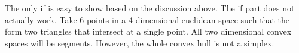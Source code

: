 \begin{remark}
	The only if is easy to show based on the discussion above. The if part does not actually work. Take 6 points in a 4 dimensional euclidean space such that the form two triangles that intersect at a single point. All two dimensional convex spaces will be segments. However, the whole convex hull is not a simplex. 
\end{remark}

